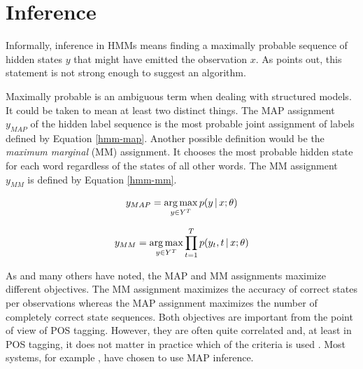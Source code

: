 \section{Inference}
Informally, inference in HMMs means finding a maximally
probable sequence of hidden states $y$ that might have emitted the
observation $x$. As \cite{Rabiner1989} points out, this statement is
not strong enough to suggest an algorithm. 

Maximally probable is an ambiguous term when dealing with structured
models. It could be taken to mean at least two distinct things. The
MAP assignment $y_{MAP}$ of the hidden label sequence is the most
probable joint assignment of labels defined by Equation
\eqref{hmm-map}. Another possible definition would be the {\it maximum
  marginal} (MM) assignment. It chooses the most probable hidden
state for each word regardless of the states of all other words. The
MM assignment $y_{MM}$ is defined by Equation \eqref{hmm-mm}.

\begin{equation}
y_{MAP} = \operatorname*{arg\,max}_{y\in Y^T} p(y\mbox{$ \, | \, $} x\mbox{$ ; \, $}\theta)\label{hmm-map}
\end{equation}

\begin{equation}
y_{MM} = \operatorname*{arg\,max}_{y\in Y^T} \prod_{t = 1}^T p(y_t, t \mbox{$ \, | \, $} x\mbox{$ ; \, $}\theta)\label{hmm-mm}
\end{equation}

As \cite{Merialdo1994} and many others have noted, the MAP and MM
assignments maximize different objectives. The MM assignment maximizes
the accuracy of correct states per observations whereas the MAP
assignment maximizes the number of completely correct state
sequences. Both objectives are important from the point of view of POS
tagging. However, they are often quite correlated and, at least in POS
tagging, it does not matter in practice which of the criteria is used
\citep{Merialdo1994}. Most systems, for example
\cite{Church1988,Brants2000,Halacsy2007}, have chosen to use MAP
inference.


